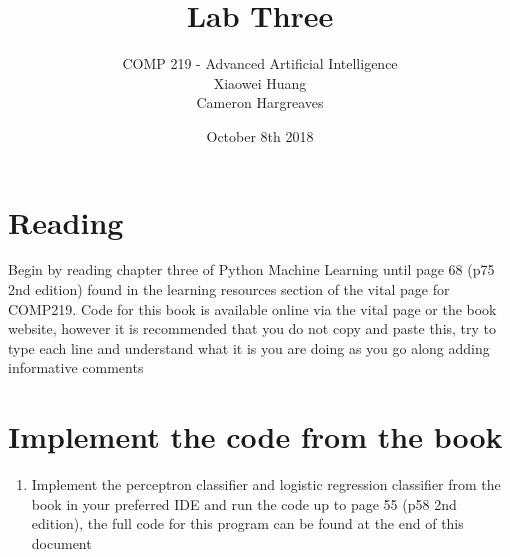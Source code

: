 \documentclass[12pt]{article}
\begin{document}


\date{October 8th 2018}
 
 
\title{Lab Three}%
\author{COMP 219 - Advanced Artificial Intelligence \\
		Xiaowei Huang \\ 
		Cameron Hargreaves\\}
 
\maketitle

\section{Reading}
Begin by reading chapter three of Python Machine Learning until page 68 (p75 2nd edition) found in the learning resources section of the vital page for COMP219. Code for this book is available online via the vital page or the book website, however it is recommended that you do not copy and paste this, try to type each line and understand what it is you are doing as you go along adding informative comments

\section{Implement the code from the book}
\begin{enumerate}
\item Implement the perceptron classifier and logistic regression classifier from the book in your preferred IDE and run the code up to page 55 (p58 2nd edition), the full code for this program can be found at the end of this document 
\end{enumerate}
\end{document}
